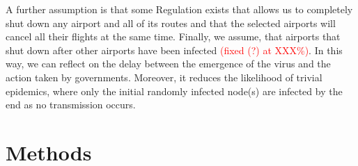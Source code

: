 \documentclass{Resources/netsci-project}
\begin{document}
A further assumption is that some Regulation exists that allows us to completely shut down any airport and all of its routes and that the selected airports will cancel all their flights at the same time. 
Finally, we assume, that airports that shut down after other airports have been infected \textcolor{red}{(fixed (?) at XXX\%)}. In this way, we can reflect on the delay between the emergence of the virus and the action taken by governments. Moreover, it reduces the likelihood of trivial epidemics, where only the initial randomly infected node(s) are infected by the end as no transmission occurs.


\begin{itemize}
\end{itemize}



\section{Methods}
\end{document}
